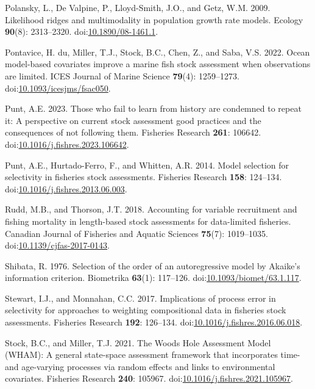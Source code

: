 \documentclass[
  12pt,
]{article}
\newlength{\cslhangindent}
\newenvironment{CSLReferences}[2] %
 {\begin{list}{}{%
  \setlength{\itemindent}{0pt}
  \setlength{\leftmargin}{0pt}
  \setlength{\parsep}{0pt}
  \ifodd #1
   \setlength{\leftmargin}{\cslhangindent}
   \setlength{\itemindent}{-1\cslhangindent}
  \fi
  \setlength{\itemsep}{#2\baselineskip}}}
 {\end{list}}
\begin{document}
\begin{CSLReferences}{1}{0}
Polansky, L., De Valpine, P., Lloyd-Smith, J.O., and Getz, W.M. 2009.
Likelihood ridges and multimodality in population growth rate models.
Ecology \textbf{90}(8): 2313--2320.
doi:\href{https://doi.org/10.1890/08-1461.1}{10.1890/08-1461.1}.

Pontavice, H. du, Miller, T.J., Stock, B.C., Chen, Z., and Saba, V.S.
2022. Ocean model-based covariates improve a marine fish stock
assessment when observations are limited. ICES Journal of Marine Science
\textbf{79}(4): 1259--1273.
doi:\href{https://doi.org/10.1093/icesjms/fsac050}{10.1093/icesjms/fsac050}.

Punt, A.E. 2023. Those who fail to learn from history are condemned to
repeat it: A perspective on current stock assessment good practices and
the consequences of not following them. Fisheries Research \textbf{261}:
106642.
doi:\href{https://doi.org/10.1016/j.fishres.2023.106642}{10.1016/j.fishres.2023.106642}.

Punt, A.E., Hurtado-Ferro, F., and Whitten, A.R. 2014. Model selection
for selectivity in fisheries stock assessments. Fisheries Research
\textbf{158}: 124--134.
doi:\href{https://doi.org/10.1016/j.fishres.2013.06.003}{10.1016/j.fishres.2013.06.003}.

Rudd, M.B., and Thorson, J.T. 2018. Accounting for variable recruitment
and fishing mortality in length-based stock assessments for data-limited
fisheries. Canadian Journal of Fisheries and Aquatic Sciences
\textbf{75}(7): 1019--1035.
doi:\href{https://doi.org/10.1139/cjfas-2017-0143}{10.1139/cjfas-2017-0143}.

Shibata, R. 1976. Selection of the order of an autoregressive model by
{A}kaike's information criterion. Biometrika \textbf{63}(1): 117--126.
doi:\href{https://doi.org/10.1093/biomet/63.1.117}{10.1093/biomet/63.1.117}.

Stewart, I.J., and Monnahan, C.C. 2017. Implications of process error in
selectivity for approaches to weighting compositional data in fisheries
stock assessments. Fisheries Research \textbf{192}: 126--134.
doi:\href{https://doi.org/10.1016/j.fishres.2016.06.018}{10.1016/j.fishres.2016.06.018}.

Stock, B.C., and Miller, T.J. 2021. The {W}oods {H}ole {A}ssessment
{M}odel ({WHAM}): {A} general state-space assessment framework that
incorporates time- and age-varying processes via random effects and
links to environmental covariates. Fisheries Research \textbf{240}:
105967.
doi:\href{https://doi.org/10.1016/j.fishres.2021.105967}{10.1016/j.fishres.2021.105967}.


\end{CSLReferences}
\end{document}
